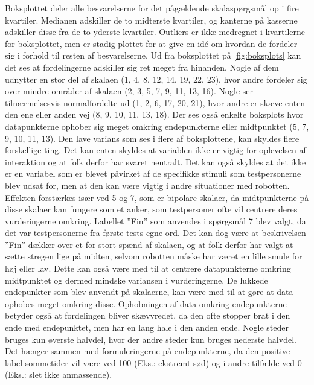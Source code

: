 Boksplottet deler alle besvarelserne for det pågældende skalaspørgsmål op i fire kvartiler. Medianen adskiller de to midterste kvartiler, og kanterne på kasserne adskiller disse fra de to yderste kvartiler. Outliers er ikke medregnet i kvartilerne for boksplottet, men er stadig plottet for at give en idé om hvordan de fordeler sig i forhold til resten af besvarelserne. \blankline
%
Ud fra boksplottet på \autoref{fig:boksplots} kan det ses at fordelingerne adskiller sig ret meget fra hinanden. Nogle af dem udnytter en stor del af skalaen (1, 4, 8, 12, 14, 19, 22, 23), hvor andre fordeler sig over mindre områder af skalaen (2, 3, 5, 7, 9, 11, 13, 16). Nogle ser tilnærmelsesvis normalfordelte ud (1, 2, 6, 17, 20, 21), hvor andre er skæve enten den ene eller anden vej (8, 9, 10, 11, 13, 18). Der ses også enkelte boksplots hvor datapunkterne ophober sig meget omkring endepunkterne eller midtpunktet (5, 7, 9, 10, 11, 13). \blankline
%
Den lave varians som ses i flere af boksplottene, kan skyldes flere forskellige ting. Det kan enten skyldes at variablen ikke er vigtig for oplevelsen af interaktion og at folk derfor har svaret neutralt. Det kan også skyldes at det ikke er en variabel som er blevet påvirket af de specifikke stimuli som testpersonerne blev udsat for, men at den kan være vigtig i andre situationer med robotten. Effekten forstærkes især ved 5 og 7, som er bipolare skalaer, da midtpunkterne på disse skalaer kan fungere som et anker, som testpersoner ofte vil centrere deres vurderingerne omkring. Labellet ”Fin” som anvendes i spørgsmål 7 blev valgt, da det var testpersonerne fra første tests egne ord. Det kan dog være at beskrivelsen ”Fin” dækker over et for stort spænd af skalaen, og at folk derfor har valgt at sætte stregen lige på midten, selvom robotten måske har været en lille smule for høj eller lav. Dette kan også være med til at centrere datapunkterne omkring midtpunktet og dermed mindske variansen i vurderingerne. \blankline
%
De lukkede endepunkter som blev anvendt på skalaerne, kan være med til at gøre at data ophobes meget omkring disse. Ophobningen af data omkring endepunkterne betyder også at fordelingen bliver skævvredet, da den ofte stopper brat i den ende med endepunktet, men har en lang hale i den anden ende.  \blankline
%
Nogle steder bruges kun øverste halvdel, hvor der andre steder kun bruges nederste halvdel. Det hænger sammen med formuleringerne på endepunkterne, da den positive label sommetider vil være ved 100 (Eks.: ekstremt sød) og i andre tilfælde ved 0 (Eks.: slet ikke anmassende).


